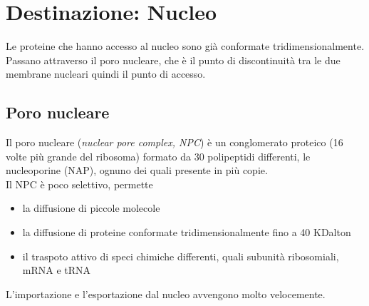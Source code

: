 \section{Destinazione: Nucleo}
    Le proteine che hanno accesso al nucleo sono già conformate tridimensionalmente. Passano attraverso il poro nucleare, che è il punto di discontinuità tra le due membrane nucleari quindi il punto di accesso.
    \subsection{Poro nucleare}
        Il poro nucleare (\textit{nuclear pore complex, NPC}) è un conglomerato proteico (16 volte più grande del ribosoma) formato da 30 polipeptidi differenti, le nucleoporine (NAP), ognuno dei quali presente in più copie.\\
        Il NPC è poco selettivo, permette
        \begin{itemize}
            \item la diffusione di piccole molecole
            \item la diffusione di proteine conformate tridimensionalmente fino a 40 KDalton
            \item il traspoto attivo di speci chimiche differenti, quali subunità ribosomiali, mRNA e tRNA
        \end{itemize}
        L'importazione e l'esportazione dal nucleo avvengono molto velocemente.
